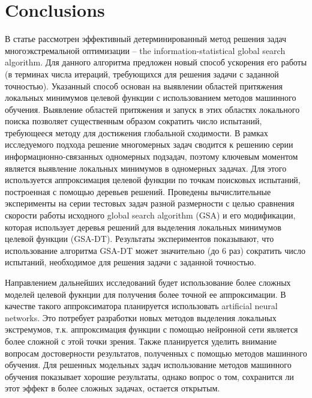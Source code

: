 \documentclass[entropy,article,submit,moreauthors,pdftex]{Definitions/mdpi}
\begin{document}
\section{Conclusions}

В статье рассмотрен эффективный детерминированный метод решения задач многоэкстремальной оптимизации -- the information-statistical global search algorithm. 
Для данного алгоритма предложен новый способ ускорения его работы (в терминах числа итераций, требующихся для решения задачи с заданной точностью). Указанный способ основан на выявлении областей притяжения локальных минимумов целевой функции с использованием методов машинного обучения. Выявление областей притяжения и запуск в этих областях локального поиска позволяет существенным образом сократить число испытаний, требующееся методу для достижения глобальной сходимости.  
В рамках исследуемого подхода решение многомерных задач сводится к решению серии информационно-связанных одномерных подзадач, поэтому ключевым моментом является выявление локальных минимумов в одномерных задачах. Для этого используется аппроксимация целевой функции по точкам поисковых испытаний, построенная с помощью деревьев решений. 
Проведены вычислительные эксперименты на серии тестовых задач разной размерности с целью сравнения скорости работы исходного global search algorithm (GSA) и его модификации, которая использует деревья решений для выделения локальных минимумов целевой функции (GSA-DT). 
Результаты экспериментов показывают, что использование алгоритма GSA-DT может значительно (до 6 раз) сократить число испытаний, необходимое для решения задачи с заданной точностью. 

Направлением дальнейших исследований будет использование более сложных моделей целевой фукнции для получения более точной ее аппроксимации. В качестве такого аппроксиматора планируется использовать artificial neural networks. Это потребует разработки новых методов выделения локальных экстремумов, т.к. аппроксимация функции с помощью нейронной сети является более сложной с этой точки зрения. Также планируется уделить внимание вопросам достоверности результатов, полученных с помощью методов машинного обучения. Для решенных модельных задач использование методов машинного обучения показывает хорошие результаты, однако вопрос о том, сохранится ли этот эффект в более сложных задачах, остается открытым. 



\end{document}
